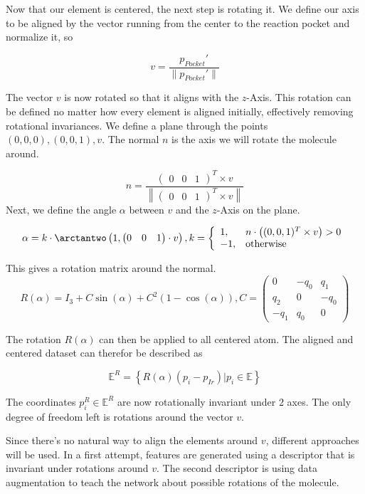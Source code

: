 Now that our element is centered, the next step is rotating it.
We define our axis to be aligned by the vector running from the center to the reaction pocket and normalize it, so

$$ v = \frac{p_{Pocket}'}{\| p_{Pocket}'\| } $$

The vector $v$ is now rotated so that it aligns with the $z$-Axis.
This rotation can be defined no matter how every element is aligned initially, effectively removing rotational invariances.
We define a plane through the points $(0,0,0), (0,0,1), v$.
The normal $n$ is the axis we will rotate the molecule around.

$$
n =\frac{\begin{pmatrix}
  0 &
  0 &
  1
\end{pmatrix}^T \times v}{ \left\| \begin{pmatrix}
  0 &
  0 &
  1
\end{pmatrix}^T \times v \right\| }
$$
Next, we define the angle $\alpha$ between $v$ and the $z$-Axis on the plane.

$$ 
\alpha = k \cdot \arctantwo \left( 1,  
\begin{pmatrix} 0 &  0 & 1 \end{pmatrix} \cdot v \right),\space k = \left\{\begin{array}{ll} 1, & n \cdot \left( (0,0,1)^T \times v \right) > 0 \\
  -1, & \text{otherwise}\end{array}\right.
$$

This gives a rotation matrix around the normal.
$$
R(\alpha) = I_3 + C \sin(\alpha) + C^2(1 - \cos(\alpha)), C =
\begin{pmatrix}
  0 & -q_0 & q_1 \\
  q_2 & 0 & -q_0\\
  -q_1 & q_0 & 0
\end{pmatrix}
$$


The rotation $R(\alpha)$ can then be applied to all centered atom.
The aligned and centered dataset can therefor be described as

$$ 
\mathbb{E}^R = \left\{ R(\alpha) (p_i - p_{Ir}) |  p_i \in \mathbb{E} \right\}
$$

The coordinates $p^R_i \in \mathbb{E}^R$ are now rotationally invariant under 2 axes. 
The only degree of freedom left is rotations around the vector $v$. 

Since there's no natural way to align the elements around $v$, different approaches will be used.
In a first attempt, features are generated using a descriptor that is invariant under rotations around $v$.
The second descriptor is using data augmentation to teach the network about possible rotations of the molecule.


